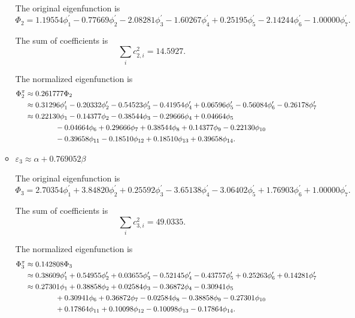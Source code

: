 \documentclass[a4paper]{book}
\begin{document}
\begin{solution}
\begin{enumerate}[label=(\alph*)]
\begin{itemize}
		The original eigenfunction is
		\begin{equation*}
			\Phi_2 = 1.19554 \phi^\prime_1 - 0.77669 \phi^\prime_2 -2.08281 \phi^\prime_3 -1.60267 \phi^\prime_4 +0.25195 \phi^\prime_5 - 2.14244 \phi^\prime_6 - 1.00000 \phi^\prime_7.
		\end{equation*}
		
		The sum of coefficients is
		\begin{equation*}
			\sum_{i} c^2_{2,i} = 14.5927.
		\end{equation*}

		The normalized eigenfunction is
		\begin{align}
			\Phi^\pi_2 &\approx 0.261777 \Phi_2 \notag \\
			&\approx 0.31296 \phi^\prime_1 - 0.20332 \phi^\prime_2 -0.54523 \phi^\prime_3 -0.41954 \phi^\prime_4 + 0.06596 \phi^\prime_5 - 0.56084 \phi^\prime_6 - 0.26178 \phi^\prime_7 \notag \\
			&\approx 0.22130 \phi_1 -0.14377 \phi_2 -0.38544 \phi_3 -0.29666 \phi_4 + 0.04664 \phi_5  \notag \\
			&\hspace*{4em} - 0.04664\phi_6 +0.29666 \phi_7 +0.38544 \phi_8 +0.14377 \phi_9  -0.22130 \phi_{10} \notag \\
			&\hspace*{4em}- 0.39658 \phi_{11} - 0.18510 \phi_{12} + 0.18510 \phi_{13} + 0.39658 \phi_{14} .
		\end{align}
		
		
		\item $\varepsilon_3 \approx \alpha + 0.769052 \beta$
		
		The original eigenfunction is
		\begin{equation*}
			\Phi_3 = 2.70354 \phi^\prime_1 + 3.84820 \phi^\prime_2 +0.25592 \phi^\prime_3 -3.65138 \phi^\prime_4 - 3.06402 \phi^\prime_5 + 1.76903 \phi^\prime_6 + 1.00000 \phi^\prime_7.
		\end{equation*}
		
		The sum of coefficients is
		\begin{equation*}
			\sum_{i} c^2_{3,i} = 49.0335.
		\end{equation*}
		
		The normalized eigenfunction is
		\begin{align}
			\Phi^\pi_3 &\approx 0.142808 \Phi_3 \notag \\
			&\approx 0.38609 \phi^\prime_1 + 0.54955 \phi^\prime_2 +0.03655 \phi^\prime_3 -0.52145 \phi^\prime_4 - 0.43757 \phi^\prime_5 + 0.25263 \phi^\prime_6 + 0.14281 \phi^\prime_7 \notag \\
			&\approx 0.27301\phi_1 +0.38858 \phi_2 +0.02584 \phi_3 -0.36872 \phi_4 -0.30941 \phi_5  \notag \\
			&\hspace*{4em} +0.30941 \phi_6 + 0.36872 \phi_7 -0.02584 \phi_8 -0.38858 \phi_9 -0.27301 \phi_{10} \notag \\
			&\hspace*{4em} +0.17864 \phi_{11} +0.10098 \phi_{12} -0.10098\phi_{13} -0.17864 \phi_{14} .
		\end{align}
		

\end{itemize}
\end{enumerate}
\end{solution}
\end{document}
